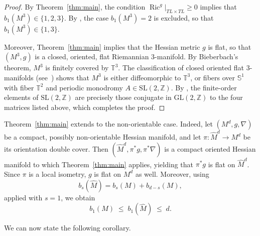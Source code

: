 \begin{proof}
By Theorem~\ref{thm:main}, the condition 
$\operatorname{Ric}^g|_{TL \times TL} \geq 0$ implies that 
$b_1(M^3) \in \{1, 2, 3\}$. By 
\citep[Theorem~3.5]{gnandi2025}, the case $b_1(M^3) = 2$ 
is excluded, so that $b_1(M^3) \in \{1, 3\}$.

Moreover, Theorem~\ref{thm:main} implies that the Hessian metric 
$g$ is flat, so that $(M^3, g)$ is a closed, oriented, flat 
Riemannian $3$-manifold. By Bieberbach's theorem, $M^3$ is finitely 
covered by $\mathbb{T}^3$. The classification of closed oriented 
flat $3$-manifolds (see~\citep{Wolf1974, bieberbach1912}) 
shows that $M^3$ is either diffeomorphic to $\mathbb{T}^3$, or 
fibers over $\mathbb{S}^1$ with fiber $\mathbb{T}^2$ and periodic 
monodromy $A \in \mathrm{SL}(2,\mathbb{Z})$. By 
\citep[Theorem~4.1]{gnandi2025}, the finite-order elements 
of $\mathrm{SL}(2,\mathbb{Z})$ are precisely those conjugate in 
$\mathrm{GL}(2,\mathbb{Z})$ to the four matrices listed above, 
which completes the proof.
\end{proof}

\begin{rem}\label{rem:nonorientable}
Theorem~\ref{thm:main} extends to the non-orientable case. Indeed,
let $(M^d, g, \nabla)$ be a compact, possibly non-orientable Hessian
manifold, and let $\pi \colon \hat{M}^d \to M^d$ be its orientation
double cover. Then $(\hat{M}^d, \pi^*g, \pi^*\nabla)$ is a compact
oriented Hessian manifold to which Theorem~\ref{thm:main} applies,
yielding that $\pi^*g$ is flat on $\hat{M}^d$. Since $\pi$ is a 
local isometry, $g$ is flat on $M^d$ as well. Moreover, using 
\citep[Theorem~(4),~p.~716]{brasher1969}
\[
b_s(\hat{M}) = b_s(M) + b_{d-s}(M),
\]
applied with $s = 1$, we obtain
\[
b_1(M) \;\leq\; b_1(\hat{M}) \;\leq\; d.
\]
\end{rem}

We can now state the following corollary.

